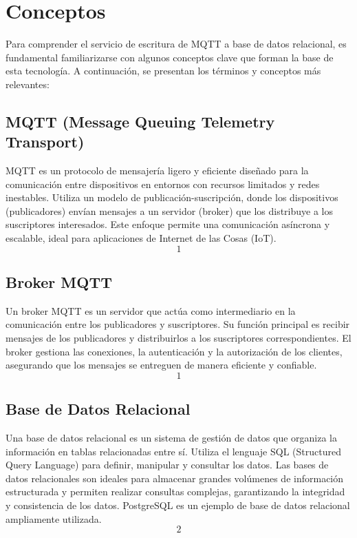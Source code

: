 \chapter{Conceptos}
\label{chap:conceptos}

Para comprender el servicio de escritura de MQTT a base de datos relacional, es fundamental familiarizarse con algunos conceptos clave que forman la base de esta tecnología. A continuación, se presentan los términos y conceptos más relevantes:

\section{MQTT (Message Queuing Telemetry Transport)}
MQTT es un protocolo de mensajería ligero y eficiente diseñado para la comunicación entre dispositivos en entornos con recursos limitados y redes inestables. Utiliza un modelo de publicación-suscripción, donde los dispositivos (publicadores) envían mensajes a un servidor (broker) que los
distribuye a los suscriptores interesados. Este enfoque permite una comunicación asíncrona y escalable, ideal para aplicaciones de Internet de las Cosas (IoT). \[1\]

\section{Broker MQTT}
Un broker MQTT es un servidor que actúa como intermediario en la comunicación entre los publicadores y suscriptores. Su función principal es recibir mensajes de los publicadores y distribuirlos a los
suscriptores correspondientes. El broker gestiona las conexiones, la autenticación y la autorización de los clientes, asegurando que los mensajes se entreguen de manera eficiente y confiable. \[1\]

\section{Base de Datos Relacional}
Una base de datos relacional es un sistema de gestión de datos que organiza la información en tablas relacionadas entre sí. Utiliza el lenguaje SQL (Structured Query Language) para definir, manipular y
consultar los datos. Las bases de datos relacionales son ideales para almacenar grandes volúmenes de información estructurada y permiten realizar consultas complejas, garantizando la integridad y consistencia de los datos. PostgreSQL es un ejemplo de base de datos relacional ampliamente utilizada. \[2\]

